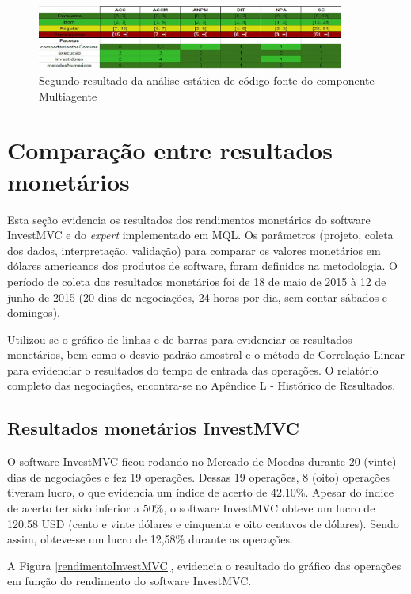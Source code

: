 \begin{figure}[H]
\centering
\includegraphics[width=0.9\textwidth]{figuras/analisefinal}
\caption{Segundo resultado da análise estática de código-fonte do componente Multiagente}
\label{analisefinal}
\end{figure}

\section{Comparação entre resultados monetários}
Esta seção evidencia os resultados dos rendimentos monetários do software InvestMVC e do \textit{expert} implementado em MQL. Os parâmetros (projeto, coleta dos dados, interpretação, validação) para comparar os valores monetários em dólares americanos dos produtos de software, foram definidos na metodologia. O período de coleta dos resultados monetários foi de 18 de maio de 2015 à 12 de junho de 2015 (20 dias de negociações, 24 horas por dia, sem contar sábados e domingos).

Utilizou-se o gráfico de linhas e de barras para evidenciar os resultados monetários, bem como o desvio padrão amostral e o método de Correlação Linear para evidenciar o resultados do tempo de entrada das operações. O relatório completo das negociações, encontra-se no Apêndice L - Histórico de Resultados.


\subsection{Resultados monetários InvestMVC}
O software InvestMVC ficou rodando no Mercado de Moedas durante 20 (vinte) dias de negociações e fez 19 operações. Dessas 19 operações, 8 (oito) operações tiveram lucro, o que evidencia um índice de acerto de 42.10\%. Apesar do índice de acerto ter sido inferior a 50\%, o software InvestMVC obteve um lucro de 120.58 USD (cento e vinte dólares e cinquenta e oito centavos de dólares). Sendo assim, obteve-se um lucro de 12,58\% durante as operações.

A Figura \ref{rendimentoInvestMVC}, evidencia o resultado do gráfico das operações em função do rendimento do software InvestMVC.

